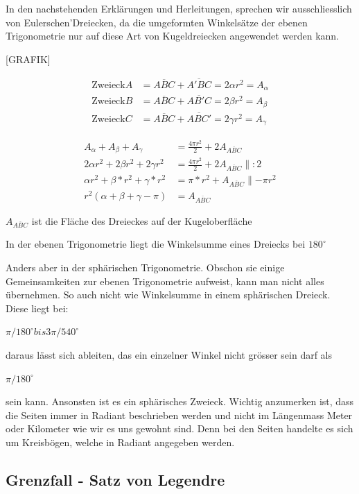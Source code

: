 \begin{refsection}
In den nachstehenden Erklärungen und Herleitungen, sprechen wir ausschliesslich von Eulerschen’Dreiecken, da die umgeformten Winkelsätze der ebenen Trigonometrie nur auf diese Art von Kugeldreiecken angewendet werden kann.

[GRAFIK]


\begin{align*}
\text{Zweieck} A
&=
\overline{ABC} + \overline{A'BC} = 2\alpha r^{ 2 } = A_{ \alpha }\\
\text{Zweieck}B
&=
\overline{ABC} + \overline{AB'C} = 2\beta r^{ 2 } = A_{ \beta }\\
\text{Zweieck}C
&=
\overline{ABC} + \overline{ABC'} = 2\gamma r^{ 2 } = A_{ \gamma }
\end{align*}

\begin{align*}
A_{ \alpha } + A_{ \beta } + A_{ \gamma } &= \frac{ 4\pi r^{ 2 } }{ 2 } + 2A_{ \overline{ ABC }} \\
2\alpha r^{ 2 } + 2\beta r^{ 2 } + 2\gamma r^{ 2 } &= \frac{ 4\pi r^{ 2 } }{ 2 } + 2A_{ \overline{ ABC }} \parallel:2\\
\alpha r^{ 2 } + \beta*r^{ 2 } + \gamma*r^{ 2 } &= \pi*r^{ 2 } + A_{ \overline{ ABC }} \parallel-\pi r^{ 2 }\\
r^{ 2 }\left(\alpha + \beta + \gamma - \pi\right) &= A_{ \overline{ ABC }}
\end{align*}

$A_{ \overline{ ABC }}$ ist die Fläche des Dreieckes auf der Kugeloberfläche


In der ebenen Trigonometrie liegt die Winkelsumme eines Dreiecks bei
$180^{\circ}$

Anders aber in der sphärischen Trigonometrie. Obschon sie einige Gemeinsamkeiten zur ebenen Trigonometrie aufweist, kann man nicht alles übernehmen.
So auch nicht wie Winkelsumme in einem sphärischen Dreieck. Diese liegt bei:

$\pi / 180^{\circ} bis 3\pi / 540^{\circ}$

daraus lässt sich ableiten, das ein einzelner Winkel nicht grösser sein darf als

$\pi / 180^{\circ}$ 

sein kann. Ansonsten ist es ein sphärisches Zweieck.
Wichtig anzumerken ist, dass die Seiten immer in Radiant
beschrieben werden und nicht im Längenmass Meter oder Kilometer wie wir es uns gewohnt sind. 
Denn bei den Seiten handelte es sich um Kreisbögen, welche in Radiant angegeben werden.


\subsection{Grenzfall - Satz von Legendre}


\end{refsection}
